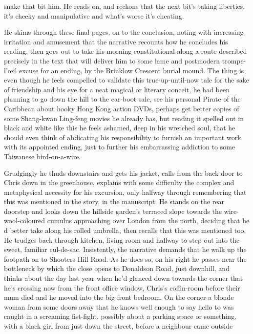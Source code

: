 \documentclass[
]{article}
\begin{document}
snake that bit him. He reads on, and reckons that the next bit's taking
liberties, it's cheeky and manipulative and what's worse it's cheating. \par
He skims through these final pages, on to the conclusion, noting
with increasing irritation and amusement that the narrative recounts how
he concludes his reading, then goes out to take his morning
constitutional along a route described precisely in the text that will
deliver him to some lame and postmodern trompe-l'œil excuse for an
ending, by the Brinklow Crescent burial mound. The thing is, even though
he feels compelled to validate this true-up-until-now tale for the sake
of friendship and his eye for a neat magical or literary conceit, he had
been planning to go down the hill to the car-boot sale, see his personal
Pirate of the Caribbean about hooky Hong Kong action DVDs, perhaps get
better copies of some Shang-kwan Ling-feng movies he already has, but
reading it spelled out in black and white like this he feels ashamed,
deep in his wretched soul, that he should even think of abdicating his
responsibility to furnish an important work with its appointed ending,
just to further his embarrassing addiction to some Taiwanese
bird-on-a-wire. \par
Grudgingly he thuds downstairs and gets his jacket, calls from the
back door to Chris down in the greenhouse, explains with some difficulty
the complex and metaphysical necessity for his excursion, only halfway
through remembering that this was mentioned in the story, in the
manuscript. He stands on the rear doorstep and looks down the hillside
garden's terraced slope towards the wire-wool-coloured cumulus
approaching over London from the north, deciding that he d better take
along his rolled umbrella, then recalls that this was mentioned too. He
trudges back through kitchen, living room and hallway to step out into
the sweet, familiar cul-de-sac. Insistently, the narrative demands that
he walk up the footpath on to Shooters Hill Road. As he does so, on his
right he passes near the bottleneck by which the close opens to
Donaldson Road, just downhill, and thinks about the day last year when
he'd glanced down towards the corner that he's crossing now from the
front office window, Chris's coffin-room before their mum died and he
moved into the big front bedroom. On the corner a blonde woman from some
doors away that he knows well enough to say hello to was caught in a
screaming fist-fight, possibly about a parking space or something, with
a black girl from just down the street, before a neighbour came outside
\end{document}
